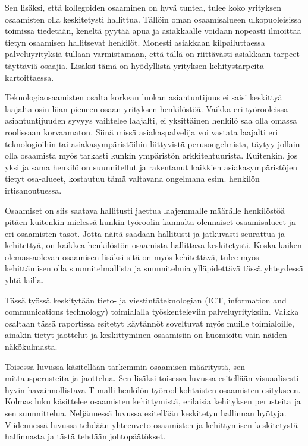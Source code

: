 \documentclass[a4paper,finnish,12pt]{article}
\begin{document}
Sen lisäksi, että kollegoiden osaaminen on hyvä tuntea, tulee koko yrityksen osaamisten olla keskitetysti hallittua. Tällöin oman osaamisalueen ulkopuoleisissa toimissa tiedetään, keneltä pyytää apua ja asiakkaalle voidaan nopeasti ilmoittaa tietyn osaamisen hallitsevat henkilöt. Monesti asiakkaan kilpailuttaessa palveluyrityksiä tullaan varmistamaan, että tällä on riittävästi asiakkaan tarpeet täyttäviä osaajia. Lisäksi tämä on hyödyllistä yrityksen kehitystarpeita kartoittaessa.

Teknologiaosaamisten osalta korkean luokan asiantuntijuus ei saisi keskittyä laajalta osin liian pieneen osaan yrityksen henkilöstöä. Vaikka eri työrooleissa asiantuntijuuden syvyys vaihtelee laajalti, ei yksittäinen henkilö saa olla omassa roolissaan korvaamaton. Siinä missä asiakaspalvelija voi vastata laajalti eri teknologioihin tai asiakasympäristöihin liittyvistä perusongelmista, täytyy jollain olla osaamista myös tarkasti kunkin ympäristön arkkitehtuurista. Kuitenkin, jos yksi ja sama henkilö on suunnitellut ja rakentanut kaikkien asiakasympäristöjen tietyt osa-alueet, kostautuu tämä valtavana ongelmana esim. henkilön irtisanoutuessa.

Osaamiset on siis saatava hallitusti jaettua laajemmalle määrälle henkilöstöä pitäen kuitenkin mielessä kunkin työroolin kannalta olennaiset osaamisalueet ja eri osaamisten tasot. Jotta näitä saadaan hallitusti ja jatkuvasti seurattua ja kehitettyä, on kaikkea henkilöstön osaamista hallittava keskitetysti. Koska kaiken olemassaolevan osaamisen lisäksi sitä on myös kehitettävä, tulee myös kehittämisen olla suunnitelmallista ja suunnitelmia ylläpidettävä tässä yhteydessä yhtä lailla.

Tässä työssä keskitytään tieto- ja viestintäteknologian (ICT, information and communications technology) toimialalla työskenteleviin palveluyrityksiin. Vaikka osaltaan tässä raportissa esitetyt käytännöt soveltuvat myös muille toimialoille, ainakin tietyt jaottelut ja keskittyminen osaamisiin on huomioitu vain näiden näkökulmasta.

Toisessa luvussa käsitellään tarkemmin osaamisen määritystä, sen mittausperusteita ja jaottelua. Sen lisäksi toisessa luvussa esitellään visuaalisesti hyvin havainnollistava T-malli henkilön työroolikohtaisten osaamisten esitykseen. Kolmas luku käsittelee osaamisten kehittymistä, erilaisia kehityksen perusteita ja sen suunnittelua. Neljännessä luvussa esitellään keskitetyn hallinnan hyötyja. Viidennessä luvussa tehdään yhteenveto osaamisten ja kehittymisen keskitetystä hallinnasta ja tästä tehdään johtopäätökset.
\end{document}
